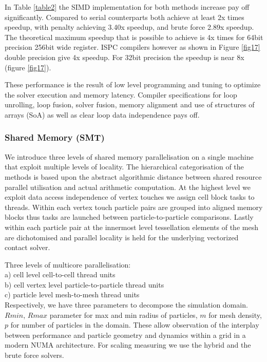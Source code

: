 \documentclass[times,12pt]{article}
\begin{document}
In Table \ref{table2} the SIMD implementation for both methods increase pay off significantly. Compared to serial counterparts both achieve at least 2x times speedup, with penalty achieving  3.40x speedup, and brute force 2.89x speedup. The theoretical maximum speedup that is possible to achieve is 4x times for 64bit precision 256bit wide register. ISPC compilers however as shown in Figure \ref{fig17} double precision give 4x speedup. For 32bit precision the speedup is near 8x (figure \ref{fig17}).


These performance is the result of low level programming and tuning to optimize the solver execution and memory latency. Compiler specifications for loop unrolling, loop fusion, solver fusion, memory alignment and use of structures of arrays (SoA) as well as clear loop data independence pays off.


\subsubsection{Shared Memory (SMT)}

We introduce three levels of shared memory parallelisation on a single machine that exploit multiple levels of locality. The hierarchical categorisation of the methods is based upon the abstract algorithmic distance between shared resource parallel utilisation and actual arithmetic computation. At the highest level we exploit  data access independence of vertex touches we assign cell block tasks to threads. Within each vertex touch particle pairs are grouped into aligned memory blocks thus tasks are launched between particle-to-particle comparisons. Lastly within each particle pair at the innermost level tessellation elements of the mesh are dichotomised and parallel locality is held for the underlying vectorized contact solver.

Three levels of multicore parallelisation:\\

a) cell level cell-to-cell thread units\\

b) cell vertex level particle-to-particle thread units\\

c) particle level mesh-to-mesh thread units\\

Respectively, we have three parameters to decompose the simulation domain. $Rmin$, $Rmax$ parameter for max and min radius of particles, $m$ for mesh density, $p$ for number of particles in the domain. These allow observation of the interplay between performance and particle geometry and dynamics within a grid in a modern NUMA architecture. For scaling measuring we use the hybrid and the brute force solvers.
\end{document}
